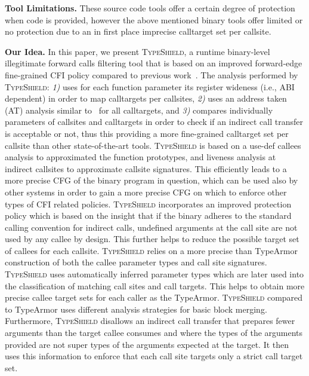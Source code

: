 \textbf{Tool Limitations.}
These source code tools offer a certain degree of protection when code is provided, however 
the above mentioned binary tools offer limited or no protection due to an in first place
imprecise calltarget set per callsite.

\textbf{Our Idea.}
In this paper, we present \textsc{TypeShield}, a runtime binary-level illegitimate forward calls 
filtering tool that is based on an improved forward-edge fine-grained CFI policy compared 
to previous work~\cite{veen:typearmor, crane:readactor++}.
The analysis performed by \textsc{TypeShield}:
\textit{1)} uses for each function parameter its register wideness (i.e., ABI dependent) in order to map calltargets per callsites,  
\textit{2)} uses an address taken (AT) analysis similar to~\cite{veen:typearmor} for all calltargets, and 
\textit{3)} compares individually parameters of callsites and calltargets in order to check if an indirect call transfer is acceptable or not, 
thus this providing a more fine-grained calltarget set per callsite than other state-of-the-art tools.
\textsc{TypeShield} is based on a use-def callees analysis to approximated the function prototypes, 
and liveness analysis at indirect callsites to approximate callsite signatures. This 
efficiently leads to a more precise CFG of the binary program in question, 
which can be used also by other systems in order to gain a more precise CFG on which to 
enforce other types of CFI related policies.
\textsc{TypeShield} incorporates an improved protection policy which is
based on the insight that if the binary adheres to the standard calling convention
for indirect calls, undefined arguments at the call site are not used by any callee by design. 
This further helps to reduce the possible target set of callees for each callsite.
\textsc{TypeShield} relies on a more precise than TypeArmor construction of both the callee parameter types and call site signatures.
\textsc{TypeShield} uses automatically inferred parameter types which are later used into the classification of matching call sites and call targets.
This helps to obtain more precise callee target sets for each caller as the TypeArmor.
\textsc{TypeShield} compared to TypeArmor uses different analysis strategies for basic block merging.
Furthermore, \textsc{TypeShield} disallows an indirect call transfer that prepares
fewer arguments than the target callee consumes and where the types of the 
arguments provided are not super types of the arguments expected at the target.
It then uses this information to enforce that each call site targets only a strict call target set.
